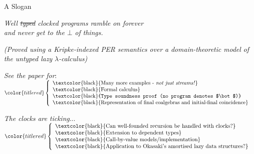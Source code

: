\documentclass[xetex,serif,mathserif]{beamer}
\newenvironment{slide}[1]{\begin{frame}\frametitle{#1}}{\end{frame}}
\begin{document}
\begin{slide}{}
  \begin{center}
    {A Slogan} \\

    \pause
    \medskip

    \emph{Well \st{typed} clocked programs ramble on forever \\ and never get to the $\bot$ of things.}

    \pause
    \medskip

    \textcolor{black!60}{\emph{(Proved using a Kripke-indexed PER
        semantics over a domain-theoretic model of the untyped lazy
        $\lambda$-calculus)}}
  \end{center}
\end{slide}

\begin{frame}
  \textcolor{titlered}{\emph{See the paper for}}:
  \quad\quad ${\color{titlered}\left\{
    \begin{array}{l}
      \textrm{\textcolor{black}{Many more examples - \emph{not just streams!}}} \\
      \textrm{\textcolor{black}{Formal calculus}} \\
      \textrm{\textcolor{black}{Type soundness proof (no program denotes $\bot$)}} \\
      \textrm{\textcolor{black}{Representation of final coalgebras and initial-final coincidence}} \\
    \end{array}\right.}$

\pause
\vspace{1.2cm}

\textcolor{titlered}{\emph{The clocks are ticking}}...
\quad\quad ${\color{titlered}\left\{
    \begin{array}{l}
      \textrm{\textcolor{black}{Can well-founded recursion be handled with clocks?}} \\
      \textrm{\textcolor{black}{Extension to dependent types}} \\
      \textrm{\textcolor{black}{Call-by-value models/implementation}} \\
      \textrm{\textcolor{black}{Application to Okasaki's amortised lazy data structures?}}
    \end{array}\right.}$

\end{frame}
\end{document}
